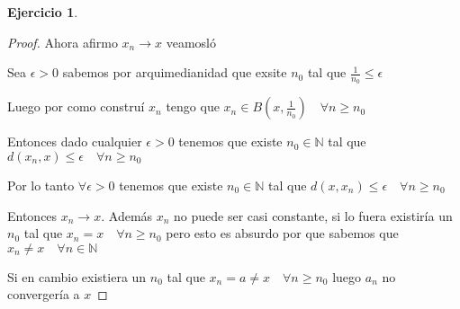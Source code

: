 \documentclass[12pt]{report}
\newcommand{\N}{\mathbb{N}}
\newcommand{\ra}{\rightarrow}
\theoremstyle{definition}
\newtheorem{ej}{Ejercicio}
\begin{document}
\begin{ej}
\begin{enumerate}
\begin{proof}
Ahora afirmo $x_{n} \ra x$ veamosló

Sea $\epsilon > 0$ sabemos por arquimedianidad que exsite $n_0$ tal que $\frac{1}{n_0} \leq \epsilon$

Luego por como construí $x_n$ tengo que $x_n \in B(x,\frac{1}{n_0}) \quad \forall n \geq n_0$

Entonces dado cualquier $\epsilon > 0$ tenemos que existe $n_0 \in \N$ tal que $d(x_n ,x ) \leq \epsilon \quad \forall n \geq n_0$

Por lo tanto $ \forall \epsilon > 0$ tenemos que existe $n_0 \in \N$ tal que $ d(x,x_n) \leq \epsilon \quad \forall n \geq n_0 $ 

Entonces $x_n \ra x$. Además $x_{n}$ no puede ser casi constante, si lo fuera existiría un $n_{0}$ tal que  $x_{n} = x \quad \forall n \geq n_{0}$ pero esto es absurdo por que sabemos que $x_n \neq x \quad \forall n \in \N$  
     
Si en cambio existiera un $n_0$ tal que $x_n = a \neq x \quad \forall n \geq n_0$ luego $a_n$ no convergería a $x$

    \end{proof}
  \end{enumerate}
\end{ej}
\end{document}
